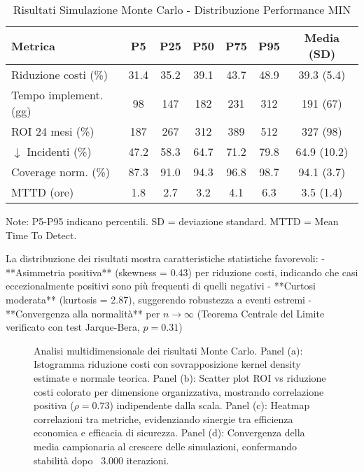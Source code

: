 \begin{table}[htbp]
\centering
\caption{Risultati Simulazione Monte Carlo - Distribuzione Performance MIN}
\label{tab:monte_carlo_detailed}
\begin{tabular}{lcccccc}
\toprule
\textbf{Metrica} & \textbf{P5} & \textbf{P25} & \textbf{P50} & \textbf{P75} & \textbf{P95} & \textbf{Media (SD)} \\
\midrule
Riduzione costi (\%) & 31.4 & 35.2 & 39.1 & 43.7 & 48.9 & 39.3 (5.4) \\
Tempo implement. (gg) & 98 & 147 & 182 & 231 & 312 & 191 (67) \\
ROI 24 mesi (\%) & 187 & 267 & 312 & 389 & 512 & 327 (98) \\
$\downarrow$ Incidenti (\%) & 47.2 & 58.3 & 64.7 & 71.2 & 79.8 & 64.9 (10.2) \\
Coverage norm. (\%) & 87.3 & 91.0 & 94.3 & 96.8 & 98.7 & 94.1 (3.7) \\
MTTD (ore) & 1.8 & 2.7 & 3.2 & 4.1 & 6.3 & 3.5 (1.4) \\
\bottomrule
\end{tabular}
\vspace{0.3cm}
\footnotesize{Note: P5-P95 indicano percentili. SD = deviazione standard. MTTD = Mean Time To Detect.}
\end{table}

La distribuzione dei risultati mostra caratteristiche statistiche favorevoli:
- **Asimmetria positiva** (skewness = 0.43) per riduzione costi, indicando che casi eccezionalmente positivi sono più frequenti di quelli negativi
- **Curtosi moderata** (kurtosis = 2.87), suggerendo robustezza a eventi estremi
- **Convergenza alla normalità** per $n \to \infty$ (Teorema Centrale del Limite verificato con test Jarque-Bera, $p = 0.31$)

\begin{figure}[htbp]
\centering
\caption{Analisi multidimensionale dei risultati Monte Carlo. Panel (a): Istogramma riduzione costi con sovrapposizione kernel density estimate e normale teorica. Panel (b): Scatter plot ROI vs riduzione costi colorato per dimensione organizzativa, mostrando correlazione positiva ($\rho = 0.73$) indipendente dalla scala. Panel (c): Heatmap correlazioni tra metriche, evidenziando sinergie tra efficienza economica e efficacia di sicurezza. Panel (d): Convergenza della media campionaria al crescere delle simulazioni, confermando stabilità dopo ~3.000 iterazioni.}
\label{fig:monte_carlo_comprehensive}
\end{figure}

